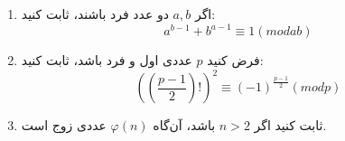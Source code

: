 \EXERCISE
\begin{enumerate}
\item
اگر
$a, b$
دو عدد فرد باشند، ثابت کنید:
$$a^{b-1} + b^{a-1} \equiv 1 (mod ab)$$
\item
فرض کنید
$p$
عددی اول و فرد باشد، ثابت کنید:
$$((\frac{p-1}{2})!)^2 \equiv (-1)^{\frac{p-1}{2}} (mod p)$$
\item
ثابت کنید اگر
$n > 2$
باشد، آن‌گاه
$\varphi(n)$
عددی زوج است.
\end{enumerate}